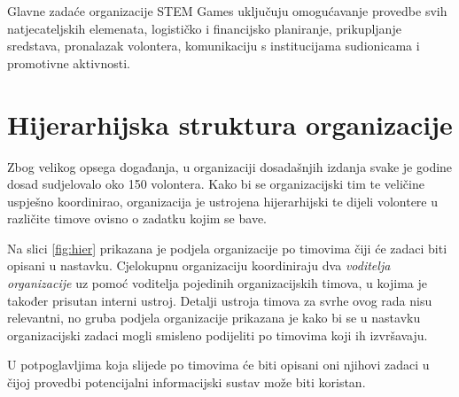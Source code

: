 \documentclass[times, utf8, diplomski]{fer}
\begin{document}
Glavne zadaće organizacije STEM Games uključuju omogućavanje provedbe svih
natjecateljskih elemenata, logističko i financijsko planiranje, prikupljanje
sredstava, pronalazak volontera, komunikaciju s institucijama sudionicama i
promotivne aktivnosti.

\section{Hijerarhijska struktura organizacije}

Zbog velikog opsega događanja, u organizaciji dosadašnjih izdanja svake je
godine dosad sudjelovalo oko 150 volontera. Kako bi se organizacijski tim te
veličine uspješno koordinirao, organizacija je ustrojena hijerarhijski te dijeli
volontere u različite timove ovisno o zadatku kojim se bave.

Na slici \ref{fig:hier} prikazana je podjela organizacije po timovima čiji će
zadaci biti opisani u nastavku. Cjelokupnu organizaciju koordiniraju dva
\emph{voditelja organizacije} uz pomoć voditelja pojedinih organizacijskih
timova, u kojima je također prisutan interni ustroj. Detalji ustroja timova za
svrhe ovog rada nisu relevantni, no gruba podjela organizacije prikazana je kako
bi se u nastavku organizacijski zadaci mogli smisleno podijeliti po timovima
koji ih izvršavaju.

U potpoglavljima koja slijede po timovima će biti opisani oni njihovi zadaci u
čijoj provedbi potencijalni informacijski sustav može biti koristan.
\end{document}
